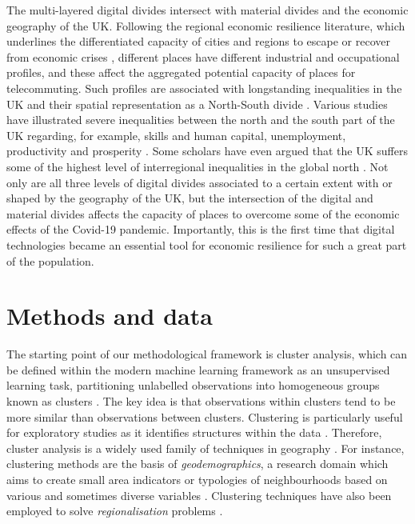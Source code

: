 \documentclass[]{interact}
\theoremstyle{plain}%
\theoremstyle{definition}
\theoremstyle{remark}
\begin{document}
The multi-layered digital divides intersect with material divides and
the economic geography of the UK. Following the regional economic
resilience literature, which underlines the differentiated capacity of
cities and regions to escape or recover from economic crises
\citep{martin2012regional, kitsos2018economic}, different places have
different industrial and occupational profiles, and these affect the
aggregated potential capacity of places for telecommuting. Such profiles
are associated with longstanding inequalities in the UK and their
spatial representation as a North-South divide
\citep{martin_north_south}. Various studies have illustrated severe
inequalities between the north and the south part of the UK regarding,
for example, skills and human capital, unemployment, productivity and
prosperity \citep{lee2014grim, mccann2020perceptions, dorling2018peak}.
Some scholars have even argued that the UK suffers some of the highest
level of interregional inequalities in the global north
\citep{gal2018reducing, mccann2016uk}. Not only are all three levels of
digital divides associated to a certain extent with or shaped by the
geography of the UK, but the intersection of the digital and material
divides affects the capacity of places to overcome some of the economic
effects of the Covid-19 pandemic. Importantly, this is the first time
that digital technologies became an essential tool for economic
resilience for such a great part of the population.

\hypertarget{sec:3}{%
\section{Methods and data}\label{sec:3}}

The starting point of our methodological framework is cluster analysis,
which can be defined within the modern machine learning framework as an
unsupervised learning task, partitioning unlabelled observations into
homogeneous groups known as clusters \citep{montero2014tsclust}. The key
idea is that observations within clusters tend to be more similar than
observations between clusters. Clustering is particularly useful for
exploratory studies as it identifies structures within the data
\citep{aghabozorgi2015time}. Therefore, cluster analysis is a widely
used family of techniques in geography
\citep{gordon1977classification, everitt1974cluster}. For instance,
clustering methods are the basis of \emph{geodemographics}, a research
domain which aims to create small area indicators or typologies of
neighbourhoods based on various and sometimes diverse variables
\citep{SINGLETON2009289, harris2005geodemographics}. Clustering
techniques have also been employed to solve \emph{regionalisation}
problems \citep{niesterowicz2016}.
\end{document}
